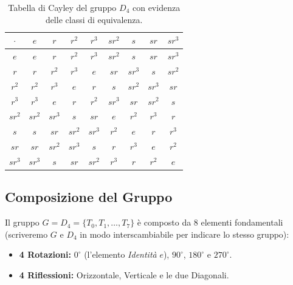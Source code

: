 \begin{table}[h]
\centering
\renewcommand{\arraystretch}{1.8}
\setlength{\tabcolsep}{10pt}
\begin{tabular}{c|cccc|cccc}
$\cdot$ & $e$ & $r$ & $r^2$ & $r^3$ & $sr^2$ & $s$ & $sr$ & $sr^3$ \\ \hline
$e$     & $e$ & $r$ & $r^2$ & $r^3$ & $sr^2$ & $s$ & $sr$ & $sr^3$ \\
$r$     & $r$ & $r^2$ & $r^3$ & $e$   & $sr$ & $sr^3$ & $s$ & $sr^2$ \\
$r^2$   & $r^2$ & $r^3$ & $e$   & $r$   & $s$ & $sr^2$ & $sr^3$ & $sr$ \\
$r^3$   & $r^3$ & $e$   & $r$   & $r^2$ & $sr^3$ & $sr$ & $sr^2$ & $s$ \\ \hline
$sr^2$   & $sr^2$ & $sr^3$ & $s$ & $sr$ & $e$   & $r^2$ & $r^3$ & $r$   \\
$s$   & $s$ & $sr$ & $sr^2$ & $sr^3$ & $r^2$ & $e$   & $r$   & $r^3$ \\
$sr$   & $sr$ & $sr^2$ & $sr^3$ & $s$ & $r$   & $r^3$ & $e$   & $r^2$ \\
$sr^3$   & $sr^3$ & $s$ & $sr$ & $sr^2$ & $r^3$ & $r$   & $r^2$ & $e$   \\
\end{tabular}
  \caption{Tabella di Cayley del gruppo $D_4$ con evidenza delle classi di equivalenza.}
  \label{tab:cayley_d4}
\end{table}

\subsection{Composizione del Gruppo}
Il gruppo $G = D_4 = \{T_0, T_1, \dots, T_7\}$ è composto da 8 elementi fondamentali (scriveremo $G$ e $D_4$ in modo interscambiabile per indicare lo stesso gruppo):
\begin{itemize}
  \item \textbf{4 Rotazioni:} $0^\circ$ (l'elemento \textit{Identità} $e$), $90^\circ$, $180^\circ$ e $270^\circ$.
  \item \textbf{4 Riflessioni:} Orizzontale, Verticale e le due Diagonali.
\end{itemize}

